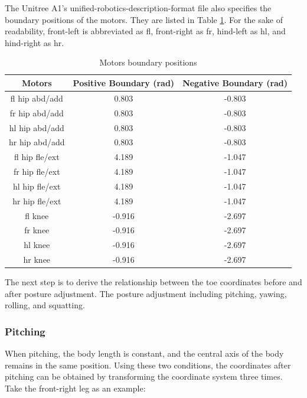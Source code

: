 
The Unitree A1's unified-robotics-description-format file also specifies the boundary positions of the motors. They are listed in Table \ref{table:motors_boundary_positions}. For the sake of readability, front-left is abbreviated as fl, front-right as fr, hind-left as hl, and hind-right as hr.

\begin{table}[htbp]
   \centering
   \caption{Motors boundary positions}
   \begin{tabular}{|c|c|c|}
   \hline
   Motors & Positive Boundary (rad) & Negative Boundary (rad) \\ \hline
   fl hip abd/add &  0.803 & -0.803 \\ \hline
   fr hip abd/add &  0.803 & -0.803 \\ \hline
   hl hip abd/add &  0.803 & -0.803 \\ \hline
   hr hip abd/add &  0.803 & -0.803 \\ \hline
   fl hip fle/ext &  4.189 & -1.047 \\ \hline
   fr hip fle/ext &  4.189 & -1.047 \\ \hline
   hl hip fle/ext &  4.189 & -1.047 \\ \hline
   hr hip fle/ext &  4.189 & -1.047 \\ \hline
   fl knee        & -0.916 & -2.697 \\ \hline
   fr knee        & -0.916 & -2.697 \\ \hline
   hl knee        & -0.916 & -2.697 \\ \hline
   hr knee        & -0.916 & -2.697 \\ \hline
   \end{tabular}
   \label{table:motors_boundary_positions}
\end{table}

The next step is to derive the relationship between the toe coordinates before and after posture adjustment. The posture adjustment including pitching, yawing, rolling, and squatting.

\subsubsection{Pitching}

When pitching, the body length is constant, and the central axis of the body remains in the same position. Using these two conditions, the coordinates after pitching can be obtained by transforming the coordinate system three times. Take the front-right leg as an example:

